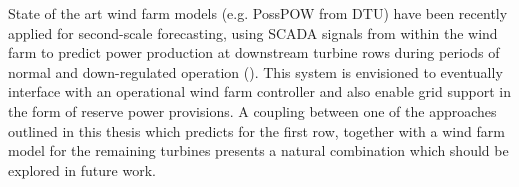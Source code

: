 State of the art wind farm models (e.g. PossPOW from DTU) have been recently applied for second-scale forecasting, using SCADA signals from within the wind farm to predict power production at downstream turbine rows during periods of normal and down-regulated operation (\cite{gocmen_possible_2019}). This system is envisioned to eventually interface with an operational wind farm controller and also enable grid support in the form of reserve power provisions. A coupling between one of the approaches outlined in this thesis which predicts for the first row, together with a wind farm model for the remaining turbines presents a natural combination which should be explored in future work.

